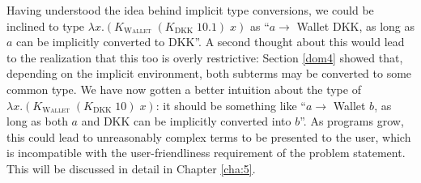 Having understood the idea behind implicit type conversions, we could be inclined to type \textsc{$\lambda x. (K_{\text{Wallet}}\;(K_{\text{DKK}}\;10.1)\;x)$} as ``$a \to$ Wallet DKK, as long as $a$ can be implicitly converted to DKK''. A second thought about this would lead to the realization that this too is overly restrictive: Section \ref{dom4} showed that, depending on the implicit environment, both subterms may be converted to some common type. We have now gotten a better intuition about the type of \textsc{$\lambda x. (K_{\text{Wallet}}\;(K_{\text{DKK}}\;10)\;x)$}: it should be something like ``$a \to$ Wallet $b$, as long as both $a$ and DKK can be implicitly converted into $b$''. As programs grow, this could lead to unreasonably complex terms to be presented to the user, which is incompatible with the user-friendliness requirement of the problem statement. This will be discussed in detail in Chapter \ref{cha:5}.




